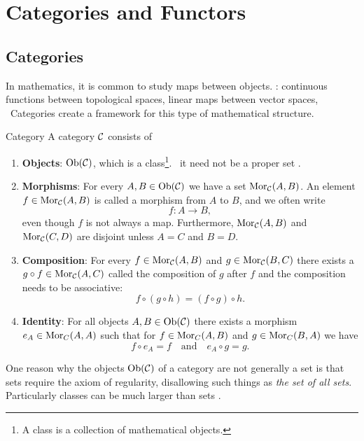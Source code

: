 \chapter{Categories and Functors}
\label{chapter__category_theory}


\section{Categories}

In mathematics, it is common to study maps between objects.
\Eg: continuous functions between topological spaces, linear maps between vector spaces, \etc\
Categories create a framework for this type of mathematical structure.

\begin{definition}{Category \cite[Sec.~1.2]{Roman2017}}{}
A category $\mathcal{C}$ consists of
\begin{enumerate}
    \item \textbf{Objects}: $\mathrm {Ob}(\mathcal{C})$, which is a class\footnote{A class is a collection of mathematical objects.}. \Ie\ it need not be a proper set \cite[p.~1]{Roman2017}.
    
    \item \textbf{Morphisms}: For every $A, B \in \mathrm {Ob}(\mathcal{C})$ we have a set $\mathrm {Mor}_{\mathcal{C}}(A,B)$. An element $f \in \mathrm {Mor}_{\mathcal{C}}(A,B)$ is called a morphism from $A$ to $B$, and we often write 
    $$
    f: A \to B,
    $$
    even though $f$ is not always a map. Furthermore, $\mathrm {Mor}_{\mathcal{C}}(A,B)$ and $\mathrm {Mor}_{\mathcal{C}}(C,D)$ are disjoint unless $A = C$ and $B = D$.
    
    \item \textbf{Composition}: For every $f \in \mathrm {Mor}_{\mathcal{C}}(A,B)$ and $g \in \mathrm {Mor}_{\mathcal{C}}(B,C)$ there exists a $g \circ f \in \mathrm {Mor}_{\mathcal{C}}(A,C)$ called the composition of $g$ after $f$ and the composition needs to be associative: 
    $$
    f \circ (g \circ h) = (f \circ g) \circ h.
    $$

    \item \textbf{Identity}: For all objects $A,B \in \mathrm {Ob}(\mathcal{C})$ there exists a morphism $e_A \in \mathrm {Mor}_C(A,A)$ such that for $f \in \mathrm {Mor}_C(A,B)$ and $g \in \mathrm {Mor}_C(B,A)$ we have
    $$
    f \circ e_A = f \quad \text{and} \quad e_A \circ g = g.
    $$
\end{enumerate}
\end{definition}

One reason why the objects $\mathrm {Ob}(\mathcal{C})$ of a category are not generally a set is that sets require the axiom of regularity, 
disallowing such things as \emph{the set of all sets}. Particularly classes can be much larger than sets \cite[p.~1]{Roman2017}.

